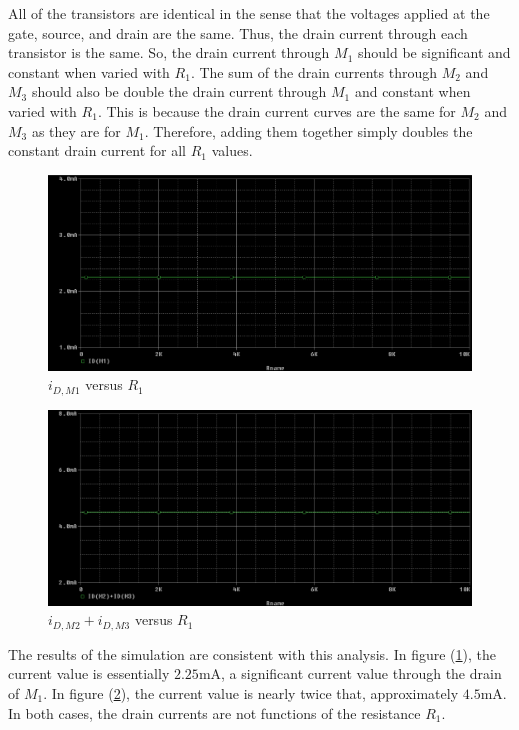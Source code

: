 All of the transistors are identical in the sense that the voltages applied at the gate, source, and drain are the same. Thus, the drain current through each transistor is the same. So, the drain current through $M_1$ should be significant and constant when varied with $R_1$. The sum of the drain currents through $M_2$ and $M_3$ should also be double the drain current through $M_1$ and constant when varied with $R_1$. This is because the drain current curves are the same for $M_2$ and $M_3$ as they are for $M_1$. Therefore, adding them together simply doubles the constant drain current for all $R_1$ values.\\

\FloatBarrier

\begin{figure}[h!]
	\centering
	\includegraphics[scale=0.5]{./images/circuit5_id1_vs_r.PNG}
	\caption{$i_{D,M1}$ versus $R_1$}
	\label{fig:circuit5_id1_vs_r}
\end{figure}

\FloatBarrier

\FloatBarrier

\begin{figure}[h!]
	\centering
	\includegraphics[scale=0.5]{./images/circuit5_id2_plus_id3_vs_r.PNG}
	\caption{$i_{D,M2} + i_{D,M3}$ versus $R_1$}
	\label{fig:circuit5_id2_plus_id3_vs_r}
\end{figure}

\FloatBarrier

The results of the simulation are consistent with this analysis. In figure (\ref{fig:circuit5_id1_vs_r}), the current value is essentially $2.25$\si{\milli\ampere}, a significant current value through the drain of $M_1$. In figure (\ref{fig:circuit5_id2_plus_id3_vs_r}), the current value is nearly twice that, approximately $4.5$\si{\milli\ampere}. In both cases, the drain currents are not functions of the resistance $R_1$.

